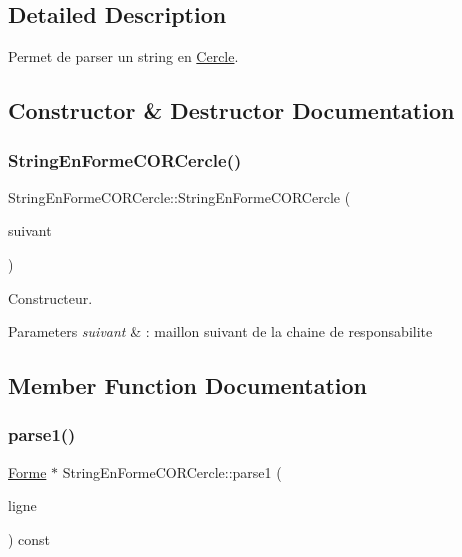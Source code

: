 \subsection{Detailed Description}
Permet de parser un string en \mbox{\hyperlink{class_cercle}{Cercle}}. 

\subsection{Constructor \& Destructor Documentation}
\mbox{\label{class_string_en_forme_c_o_r_cercle_ab5995f81a07ffa0650c3545e6a0d6d75}} 
\subsubsection{\texorpdfstring{StringEnFormeCORCercle()}{StringEnFormeCORCercle()}}
{\footnotesize\ttfamily String\+En\+Forme\+C\+O\+R\+Cercle\+::\+String\+En\+Forme\+C\+O\+R\+Cercle (\begin{DoxyParamCaption}\item[{\mbox{\hyperlink{class_string_en_forme_c_o_r}{String\+En\+Forme\+C\+OR}} $\ast$}]{suivant }\end{DoxyParamCaption})\hspace{0.3cm}{\ttfamily [inline]}}



Constructeur. 


\begin{DoxyParams}{Parameters}
{\em suivant} & \+: maillon suivant de la chaine de responsabilite \\
\hline
\end{DoxyParams}


\subsection{Member Function Documentation}
\mbox{\label{class_string_en_forme_c_o_r_cercle_aedfc3cf191db95e0e52f8a48d1e89016}} 
\subsubsection{\texorpdfstring{parse1()}{parse1()}}
{\footnotesize\ttfamily \mbox{\hyperlink{class_forme}{Forme}} $\ast$ String\+En\+Forme\+C\+O\+R\+Cercle\+::parse1 (\begin{DoxyParamCaption}\item[{const string \&}]{ligne }\end{DoxyParamCaption}) const\hspace{0.3cm}{\ttfamily [virtual]}}



